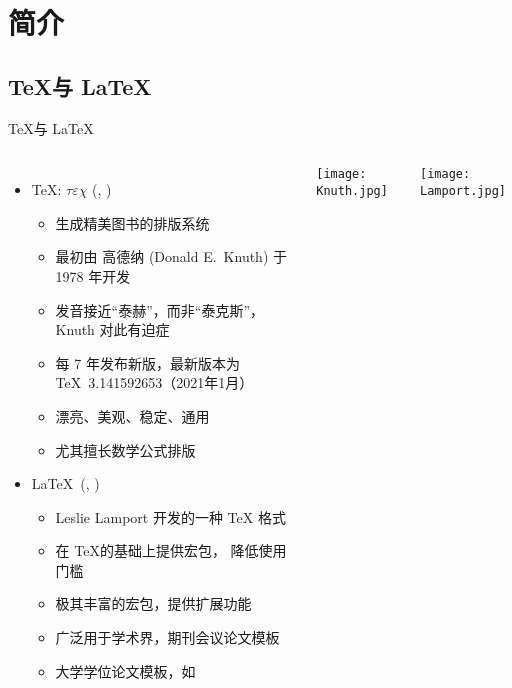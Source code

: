 
\section{简介}

\subsection{\TeX 与 \LaTeX}

\begin{frame}[fragile]{\TeX 与 \LaTeX}
  \begin{columns}[T]
    \begin{itemize}
      \item \TeX: $\tau\varepsilon\chi$ (,
        )
        \begin{itemize}
          \item 生成精美图书的排版系统
          \item 最初由 高德纳 (Donald E.~Knuth) 于 1978 年开发
          \item 发音接近“泰赫”，而非“泰克斯”，
            Knuth 对此有迫症
          \item 每 7 年发布新版，最新版本为 \TeX\ 3.141592653（2021年1月）
          \item 漂亮、美观、稳定、通用
          \item 尤其擅长数学公式排版
        \end{itemize}
      \item \LaTeX\ (, )
        \begin{itemize}
          \item Leslie Lamport 开发的一种 \TeX{} 格式
          \item 在 \TeX 的基础上提供宏包， 降低使用门槛
          \item 极其丰富的宏包，提供扩展功能
          \item 广泛用于学术界，期刊会议论文模板
          \item 大学学位论文模板，如 \ThuThesis
        \end{itemize}
    \end{itemize}
    \texttt{[image: Knuth.jpg]}

    \texttt{[image: Lamport.jpg]}

  \end{columns}
\end{frame}

